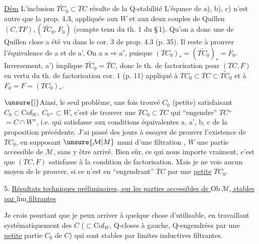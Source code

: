 \uline{Dém} L'inclusion $\widetilde{TC_0}\subset TC$ résulte de la Q-stabilité
L'équnce de a), b), c) n'est autre que
la prop. 4.3, appliquée aux $W$ et aux deux
couples de Quillen $(C,TF),(\widetilde{TC_0},F_0)$ (compte
tenu du th. 1 du \S\,1).  Qu'on a donc
une  de Quillen close a été vu
dans le cor. 3 de prop. 4.3 (p. 35). 
Il reste à prouver l'équivalence de
a et de a'. On a $\mathrm a\Rightarrow\mathrm a'$, puisque
$(TC_0)_*=(\widetilde{TC_0})_*=F_0$.  Inversement,
a') implique $\widetilde{TC_0}=\widetilde{TC}$, donc le th. de
factorisation pour $(TC,F)$ en vertu du
th. de factorisation cor. 1 (p. 11) appliqué à
 $TC_0\subset TC\subset\widetilde{TC_0}$ et à $F_0=F=(TC_0)_*$.


$\unsure{[}$Ainsi, le seul problème, une fois trouvé $C_0$
(petite) satisfaisant $C_0\subset\mathrm{Cof}_W,\ C_{0*}\subset W$,
c'est de trouver une  $TC_0\subset TC$
qui ``engendre'' $TC$``$=C\cap W$'', i.e. qui satisfasse
aux conditions équivalentes a, a', b, c de la
proposition précédente. J'ai passé des jours
à essayer de prouver l'existence de $TC_0$,
en supposant $\unsure{\mathcal M|M}$ muni d'une filtration
,  $W$ une partie accessible de $\mathcal M$,
sans y être arrivé. Bien sûr,  ce qui
nous importe vraiment, c'est que $(TC,F)$ satisfasse
à la condition de factorisation. Mais je
ne vois aucun moyen de le prouver, si ce
n'est en ``engendrant''  $TC$  par une \uline{petite}
 $TC_0$.

5. \uline{Résultats techniques préliminaires, sur les parties
accessibles de $\mathrm{Ob}\,\mathcal M$, stables par $\underrightarrow{\mathrm{lim}}$ filtrantes}

Je crois pourtant que je peux arriver à
quelque chose d'utilisable, en travaillant systématiquement  des $C$ ($\subset\mathrm{Cof}_W$, Q-closes à
gauche, Q-engendrées  par une \uline{petite} partie
$C_0$ \deleted{\unsure{)}} de $C$) qui sont stables par  limites
inductives filtrantes.

